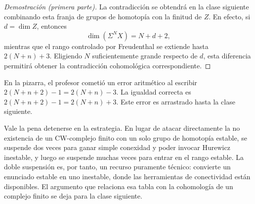 \begin{proof}[Demostración (primera parte)]
La contradicción se obtendrá en la clase siguiente combinando esta franja de grupos de homotopía con la finitud de $Z$. En efecto, si $d=\dim Z$, entonces
\[
\dim(\Sigma^NX)=N+d+2,
\]
mientras que el rango controlado por Freudenthal se extiende hasta $2(N+n)+3$. Eligiendo $N$ suficientemente grande respecto de $d$, esta diferencia permitirá obtener la contradicción cohomológica correspondiente.
\end{proof}

\begin{nota}
En la pizarra, el profesor cometió un error aritmético al escribir $2(N+n+2)-1=2(N+n)-3$. La igualdad correcta es $2(N+n+2)-1=2(N+n)+3$. Este error es arrastrado hasta la clase siguiente.
\end{nota}

\begin{nota}
   Vale la pena detenerse en la estrategia. En lugar de atacar directamente la no existencia de un CW-complejo finito con un solo grupo de homotopía estable, se suspende dos veces para ganar simple conexidad y poder invocar Hurewicz inestable, y luego se suspende muchas veces para entrar en el rango estable. La doble suspensión es, por tanto, un recurso puramente técnico: convierte un enunciado estable en uno inestable, donde las herramientas de conectividad están disponibles. El argumento que relaciona esa tabla con la cohomología de un complejo finito se deja para la clase siguiente.
\end{nota}
